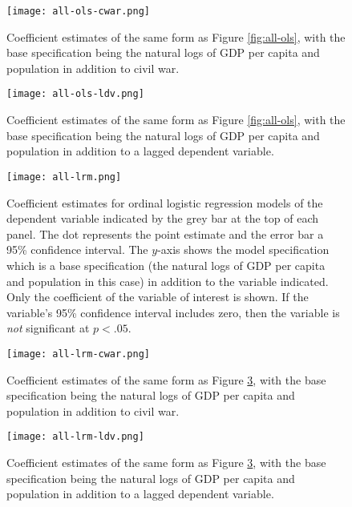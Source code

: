 \documentclass[12pt]{article}
\begin{document}
\begin{figure}[!htpb]
\texttt{[image: all-ols-cwar.png]}
\caption{Coefficient estimates of the same form as Figure \ref{fig:all-ols}, with the base specification being the natural logs of GDP per capita and population in addition to civil war.}
\label{fig:all-ols-cwar}
\end{figure}

\begin{figure}[!htpb]
\texttt{[image: all-ols-ldv.png]}
\caption{Coefficient estimates of the same form as Figure \ref{fig:all-ols}, with the base specification being the natural logs of GDP per capita and population in addition to a lagged dependent variable.}
\label{fig:all-ols-ldv}
\end{figure}

\begin{figure}[!htpb]
\texttt{[image: all-lrm.png]}
\caption{Coefficient estimates for ordinal logistic regression models of the dependent variable indicated by the grey bar at the top of each panel. The dot represents the point estimate and the error bar a 95\% confidence interval. The $y$-axis shows the model specification which is a base specification (the natural logs of GDP per capita and population in this case) in addition to the variable indicated. Only the coefficient of the variable of interest is shown. If the variable's 95\% confidence interval includes zero, then the variable is \textit{not} significant at $p < .05$.}
\label{fig:all-lrm}
\end{figure}

\begin{figure}[!htpb]
\texttt{[image: all-lrm-cwar.png]}
\caption{Coefficient estimates of the same form as Figure \ref{fig:all-lrm}, with the base specification being the natural logs of GDP per capita and population in addition to civil war.}
\label{fig:all-lrm-cwar}
\end{figure}

\begin{figure}[!htpb]
\texttt{[image: all-lrm-ldv.png]}
\caption{Coefficient estimates of the same form as Figure \ref{fig:all-lrm}, with the base specification being the natural logs of GDP per capita and population in addition to a lagged dependent variable.}
\label{fig:all-lrm-ldv}
\end{figure}
\end{document}
